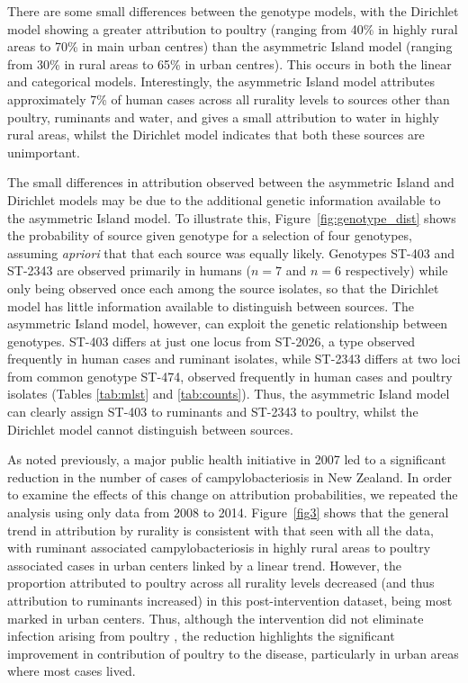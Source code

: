 \documentclass[times, doublespace]{simauth}%
\begin{document}
There are some small differences between the genotype models, with the Dirichlet model showing a greater attribution to poultry (ranging from 40\% in highly rural areas to 70\% in main urban centres) than the asymmetric Island model (ranging from 30\% in rural areas to 65\% in urban centres). This occurs in both the linear and categorical models. Interestingly, the asymmetric Island model attributes approximately 7\% of human cases across all rurality levels to sources other than poultry, ruminants and water, and gives a small attribution to water in highly rural areas, whilst the Dirichlet model indicates that both these sources are unimportant.

The small differences in attribution observed between the asymmetric Island and Dirichlet models may be due to the additional genetic information available to the asymmetric Island model. To illustrate this, Figure~\ref{fig:genotype_dist} shows the probability of source given genotype for a selection of four genotypes, assuming \emph{apriori} that that each source was equally likely. Genotypes ST-403 and ST-2343 are observed primarily in humans ($n=7$ and $n=6$ respectively) while only being observed once each among the source isolates, so that the Dirichlet model has little information available to distinguish between sources. The asymmetric Island model, however, can exploit the genetic relationship between genotypes. ST-403 differs at just one locus from ST-2026, a type observed frequently in human cases and ruminant isolates, while ST-2343 differs at two loci from common genotype ST-474, observed frequently in human cases and poultry isolates (Tables \ref{tab:mlst} and \ref{tab:counts}). Thus, the asymmetric Island model can clearly assign ST-403 to ruminants and ST-2343 to poultry, whilst the Dirichlet model cannot distinguish between sources.

As noted previously, a major public health initiative in 2007 led to a significant reduction in the number of cases of campylobacteriosis in New Zealand. In order to examine the effects of this change on attribution probabilities, we repeated the analysis using only data from 2008 to 2014. Figure~\ref{fig3} shows that the general trend in attribution by rurality is consistent with that seen with all the data, with ruminant associated campylobacteriosis in highly rural areas to poultry associated cases in urban centers linked by a linear trend. However, the proportion attributed to poultry across all rurality levels decreased (and thus attribution to ruminants increased) in this post-intervention dataset, being most marked in urban centers. Thus, although the intervention did not eliminate infection arising from poultry \cite{MuelM}, the reduction highlights the significant improvement in contribution of poultry to the disease, particularly in urban areas where most cases lived.
\end{document}
